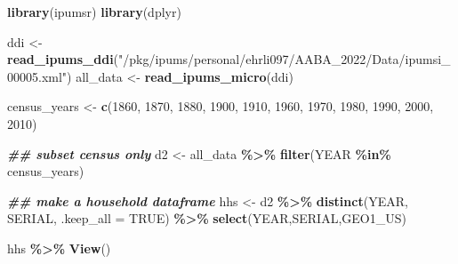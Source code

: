\documentclass[
]{book}
\newenvironment{Shaded}{\begin{snugshade}}{\end{snugshade}}
\newcommand{\AttributeTok}[1]{\textcolor[rgb]{0.13,0.29,0.53}{#1}}
\newcommand{\ConstantTok}[1]{\textcolor[rgb]{0.56,0.35,0.01}{#1}}
\newcommand{\DecValTok}[1]{\textcolor[rgb]{0.00,0.00,0.81}{#1}}
\newcommand{\DocumentationTok}[1]{\textcolor[rgb]{0.56,0.35,0.01}{\textbf{\textit{#1}}}}
\newcommand{\FunctionTok}[1]{\textcolor[rgb]{0.13,0.29,0.53}{\textbf{#1}}}
\newcommand{\NormalTok}[1]{#1}
\newcommand{\OtherTok}[1]{\textcolor[rgb]{0.56,0.35,0.01}{#1}}
\newcommand{\SpecialCharTok}[1]{\textcolor[rgb]{0.81,0.36,0.00}{\textbf{#1}}}
\newcommand{\StringTok}[1]{\textcolor[rgb]{0.31,0.60,0.02}{#1}}
\begin{document}
\begin{Shaded}
\begin{Highlighting}[]
\FunctionTok{library}\NormalTok{(ipumsr)}
\FunctionTok{library}\NormalTok{(dplyr)}

\NormalTok{ddi }\OtherTok{\textless{}{-}} \FunctionTok{read\_ipums\_ddi}\NormalTok{(}\StringTok{"/pkg/ipums/personal/ehrli097/AABA\_2022/Data/ipumsi\_00005.xml"}\NormalTok{)}
\NormalTok{all\_data }\OtherTok{\textless{}{-}} \FunctionTok{read\_ipums\_micro}\NormalTok{(ddi)}

\NormalTok{census\_years }\OtherTok{\textless{}{-}} \FunctionTok{c}\NormalTok{(}\DecValTok{1860}\NormalTok{, }\DecValTok{1870}\NormalTok{, }\DecValTok{1880}\NormalTok{, }\DecValTok{1900}\NormalTok{, }\DecValTok{1910}\NormalTok{, }\DecValTok{1960}\NormalTok{, }\DecValTok{1970}\NormalTok{, }\DecValTok{1980}\NormalTok{, }\DecValTok{1990}\NormalTok{, }\DecValTok{2000}\NormalTok{, }\DecValTok{2010}\NormalTok{)}

\DocumentationTok{\#\# subset census only}
\NormalTok{d2 }\OtherTok{\textless{}{-}}\NormalTok{ all\_data }\SpecialCharTok{\%\textgreater{}\%} \FunctionTok{filter}\NormalTok{(YEAR }\SpecialCharTok{\%in\%}\NormalTok{ census\_years)}

\DocumentationTok{\#\# make a household dataframe}
\NormalTok{hhs }\OtherTok{\textless{}{-}}\NormalTok{ d2 }\SpecialCharTok{\%\textgreater{}\%} \FunctionTok{distinct}\NormalTok{(YEAR, SERIAL, }\AttributeTok{.keep\_all =} \ConstantTok{TRUE}\NormalTok{) }\SpecialCharTok{\%\textgreater{}\%} \FunctionTok{select}\NormalTok{(YEAR,SERIAL,GEO1\_US)}

\NormalTok{hhs }\SpecialCharTok{\%\textgreater{}\%} \FunctionTok{View}\NormalTok{()}
\end{Highlighting}
\end{Shaded}
\end{document}
